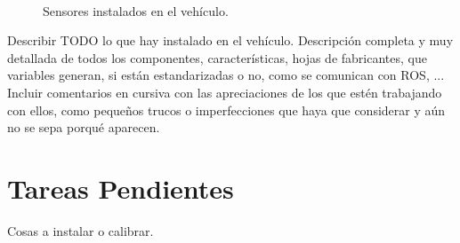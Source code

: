 \begin{figure}[!ht]
\centering
	\\
	\caption{Sensores instalados en el vehículo.}
\end{figure}

Describir TODO lo que hay instalado en el vehículo. Descripción completa y muy detallada de todos los componentes, características, hojas de fabricantes, que variables generan, si están estandarizadas o no, como se comunican con ROS, ... Incluir comentarios en cursiva con las apreciaciones de los que estén trabajando con ellos, como pequeños trucos o imperfecciones que haya que considerar y aún no se sepa porqué aparecen.

\section{Tareas Pendientes}
Cosas a instalar o calibrar.